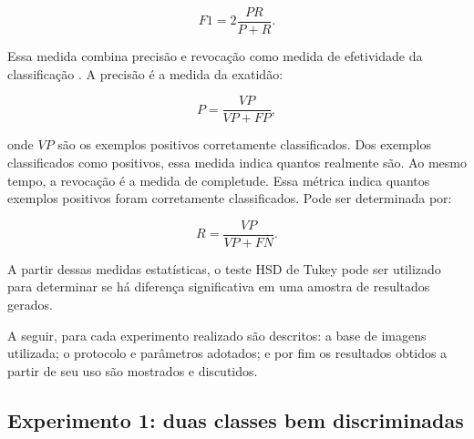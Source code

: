 \begin{equation*}
  F1 = 2 \frac{PR}{P+R}.
\end{equation*}

Essa medida combina precisão e revocação como medida de efetividade da classificação \cite{Garcia2009}. A precisão é a medida da exatidão:

\begin{equation*}
  P = \frac{VP}{VP + FP},
\end{equation*}

\noindent onde $VP$ são os exemplos positivos corretamente classificados. Dos exemplos classificados como positivos, essa medida indica quantos realmente são. Ao mesmo tempo, a revocação é a medida de completude. Essa métrica indica quantos exemplos positivos foram corretamente classificados. Pode ser determinada por:

\begin{equation*}
  R = \frac{VP}{VP + FN}.
\end{equation*}

A partir dessas medidas estatísticas, o teste HSD de Tukey pode ser utilizado para determinar se há diferença significativa em uma amostra de resultados gerados.



A seguir, para cada experimento realizado são descritos: a base de imagens utilizada; o protocolo e parâmetros adotados; e por fim os resultados obtidos a partir de seu uso são mostrados e discutidos.

\FloatBarrier
\subsection{Experimento 1: duas classes bem discriminadas}

